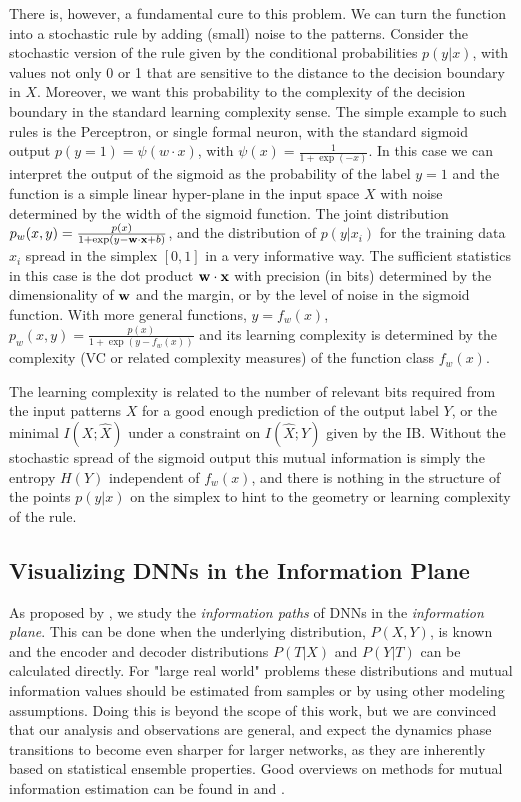 \documentclass[11pt]{article}
\begin{document}
There is, however, a fundamental cure to this problem. We can turn the function into a stochastic rule by adding (small) noise to the patterns.  Consider the stochastic version of the rule given by the conditional probabilities $p(y|x)$, with values not only 0 or 1 that are sensitive to the distance to the decision boundary in $X$. Moreover, we want this probability to the complexity of the decision boundary in the standard learning complexity sense. The simple example to such rules is the Perceptron, or single formal neuron, with the standard sigmoid output $p(y=1)=\psi(w\cdot x)$, with $\psi(x)=\frac{1}{1+\exp(-x)}$. In this case we can interpret the output of the sigmoid as the probability of the label $y=1$ and the function is a simple linear hyper-plane in the input space $X$ with noise determined by the width of the sigmoid function. The joint distribution $p_w(x,y)=\frac{p(x)}{1+\exp(y-{\bf w}\cdot {\bf x}+{b})}$, and the distribution of $p(y|x_i)$ for the training data $x_i$ spread in the simplex $[0,1]$ in a very informative way. 
The sufficient statistics in this case is the dot product ${\bf w}\cdot {\bf x}$ with precision (in bits)  determined by the dimensionality of ${\bf w}$ and the margin, or by the level of noise in the sigmoid function. With more general functions, $y=f_w(x)$, 
$p_w(x,y)=\frac{p(x)}{1+\exp(y-f_w(x))}$ and its learning complexity is determined by the complexity (VC or related complexity measures) of the function class $f_w(x)$.

The learning complexity is related to the number of relevant bits required from the input patterns $X$ for a good enough prediction of the output label $Y$, or the minimal $I(X;\hat{X})$ under a constraint on $I(\hat{X};Y)$ given by the IB. Without the stochastic spread of the sigmoid output this mutual information is simply the entropy $H(Y)$ independent of $f_w(x)$, and there is nothing in the structure of the points $p(y|x)$ on the simplex to hint to the geometry or learning complexity of the rule.    


\subsection{Visualizing DNNs in the Information Plane}

As proposed by \citet{DBLP:journals/corr/TishbyZ15}, we study the \emph{information paths} of DNNs in the \emph{information plane}. This can be done when the underlying distribution, $P(X,Y)$, is known and the encoder and decoder distributions $P(T|X)$ and $P(Y|T)$ can be calculated directly. For "large real world" problems these distributions and mutual information values should be estimated from samples or by using other modeling assumptions. Doing this is beyond the scope of this work, but we are convinced that our analysis and observations are general, and expect the dynamics phase transitions to become even sharper for larger networks, as they are inherently based on statistical ensemble properties. Good overviews on methods for mutual information estimation can be found in \citet{Paninski:2003:EEM:795523.795524} and \citet {PhysRevE.69.066138}.
\end{document}
